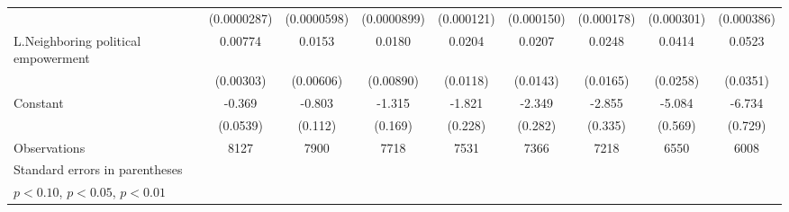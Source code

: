 \begin{table}[htbp]
\begin{tabular}{l*{8}{c}}
                    & (0.0000287)         & (0.0000598)         & (0.0000899)         &  (0.000121)         &  (0.000150)         &  (0.000178)         &  (0.000301)         &  (0.000386)         \\
[1em]
L.Neighboring political empowerment&     0.00774\sym{**} &      0.0153\sym{**} &      0.0180\sym{**} &      0.0204\sym{*}  &      0.0207         &      0.0248         &      0.0414         &      0.0523         \\
                    &   (0.00303)         &   (0.00606)         &   (0.00890)         &    (0.0118)         &    (0.0143)         &    (0.0165)         &    (0.0258)         &    (0.0351)         \\
[1em]
Constant            &      -0.369\sym{***}&      -0.803\sym{***}&      -1.315\sym{***}&      -1.821\sym{***}&      -2.349\sym{***}&      -2.855\sym{***}&      -5.084\sym{***}&      -6.734\sym{***}\\
                    &    (0.0539)         &     (0.112)         &     (0.169)         &     (0.228)         &     (0.282)         &     (0.335)         &     (0.569)         &     (0.729)         \\
\hline
Observations        &        8127         &        7900         &        7718         &        7531         &        7366         &        7218         &        6550         &        6008         \\
\hline\hline
\multicolumn{9}{l}{\footnotesize Standard errors in parentheses}\\
\multicolumn{9}{l}{\footnotesize \sym{*} \(p<0.10\), \sym{**} \(p<0.05\), \sym{***} \(p<0.01\)}\\
\end{tabular}
\end{table}
